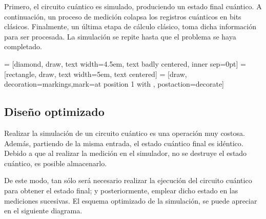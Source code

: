 Primero, el circuito cuántico es simulado, produciendo un estado final cuántico.  
A continuación, un proceso de medición colapsa los registros cuánticos en bits 
clásicos. Finalmente, un última etapa de cálculo clásico, toma dicha información 
para ser procesada. La simulación se repite hasta que el problema se haya 
completado.
%
\begin{center}
 = [diamond, draw, text width=4.5em, text badly centered, 
inner sep=0pt]
 = [rectangle, draw, text width=5em, text centered]
 = [draw, decoration={markings,mark=at position 
1 with {}}, postaction={decorate}]
%
\end{center}
%

\subsection{Diseño optimizado}
Realizar la simulación de un circuito cuántico es una operación muy costosa.  
Además, partiendo de la misma entrada, el estado cuántico final es idéntico.  
Debido a que al realizar la medición en el simulador, no se destruye el estado 
cuántico, es posible almacenarlo.

De este modo, tan sólo será necesario realizar la ejecución del circuito 
cuántico para obtener el estado final; y posteriormente, emplear dicho estado en 
las mediciones sucesivas. El esquema optimizado de la simulación, se puede 
apreciar en el siguiente diagrama.

